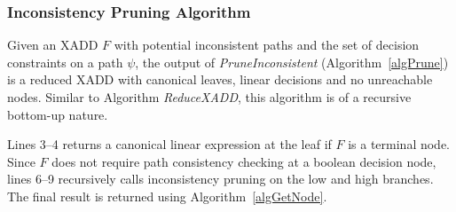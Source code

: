 \documentclass[twoside,11pt]{article}
\begin{document}
\subsubsection{Inconsistency Pruning Algorithm}
Given an XADD $F$ with potential inconsistent paths and the set of decision constraints on a path $\psi$, the output of \emph{PruneInconsistent} (Algorithm~\ref{algPrune}) is a reduced XADD with canonical leaves, linear decisions and no unreachable nodes. Similar to Algorithm \emph{ReduceXADD}, this algorithm is of a recursive bottom-up nature. 

Lines 3--4 returns a canonical linear expression at the leaf if $F$ is a terminal node. Since $F$ does not require path consistency checking at a boolean decision node, lines 6--9 recursively calls inconsistency pruning on the low and high branches. The final result is returned using Algorithm~\ref{algGetNode}.
\end{document}

